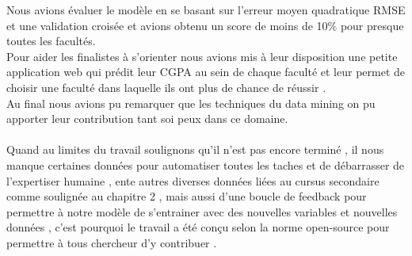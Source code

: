 Nous avions évaluer le modèle en se basant sur l'erreur moyen quadratique \ac{RMSE} et une validation croisée et avions obtenu un score de moins de 10\% pour presque toutes les facultés.\\
Pour aider les finalistes à s'orienter nous avions mis à leur disposition une petite application web  qui prédit leur \ac{CGPA} au sein de chaque faculté et leur permet de choisir une faculté dans laquelle ils ont plus de chance de réussir .\\
Au final nous avions pu remarquer que les techniques du data mining on pu apporter leur contribution tant soi peux dans ce domaine. 
\paragraph{}
Quand au limites du travail soulignons qu'il n'est pas encore terminé , il nous manque certaines données pour automatiser toutes les taches et de débarrasser de l'expertiser humaine , ente autres diverses données liées au cursus secondaire comme soulignée au chapitre 2 ,  mais aussi d'une boucle de feedback pour permettre à notre modèle de s'entrainer avec des nouvelles variables et nouvelles données , c'est pourquoi le travail a été conçu selon la norme open-source pour permettre à tous chercheur d'y contribuer .